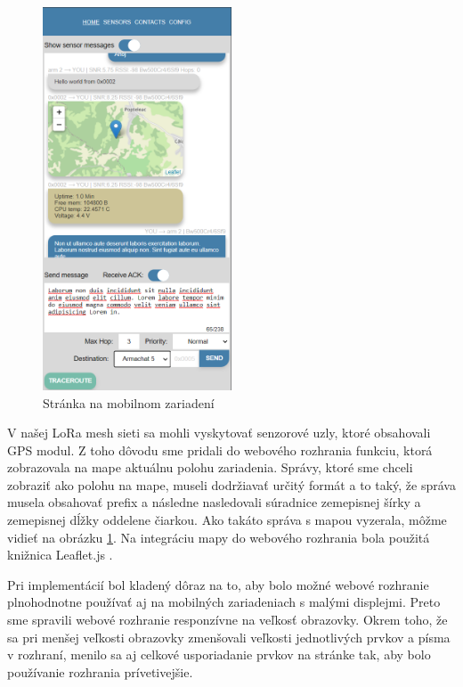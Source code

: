 \documentclass[slovak,master]{diploma}
\begin{document}
\begin{figure}
  \begin{center}
    \includegraphics[width=0.5\textwidth]{Figures/mobileWeb.png}
  \end{center}
  \caption{Stránka na mobilnom zariadení}
  \label{fig:mobileWeb}
\end{figure}

V našej LoRa mesh sieti sa mohli vyskytovať senzorové uzly, ktoré obsahovali GPS modul. Z toho dôvodu sme pridali do webového rozhrania funkciu, 
ktorá zobrazovala na mape aktuálnu polohu zariadenia. Správy, ktoré sme chceli zobraziť ako polohu na mape, museli dodržiavať určitý formát 
a to taký, že správa musela obsahovať prefix  a následne nasledovali súradnice zemepisnej šírky a zemepisnej dĺžky oddelene čiarkou.
Ako takáto správa s mapou vyzerala, môžme vidieť na obrázku \ref{fig:mobileWeb}. Na integráciu mapy do webového rozhrania bola použitá knižnica Leaflet.js \cite{leaflet}.

Pri implementácií bol kladený dôraz na to, aby bolo možné webové rozhranie plnohodnotne používať aj na mobilných zariadeniach s malými displejmi. Preto sme 
spravili webové rozhranie responzívne na veľkosť obrazovky. Okrem toho, že sa pri menšej veľkosti obrazovky zmenšovali veľkosti jednotlivých prvkov a písma v rozhraní, 
menilo sa aj celkové usporiadanie prvkov na stránke tak, aby bolo používanie rozhrania prívetivejšie. 
\end{document}
